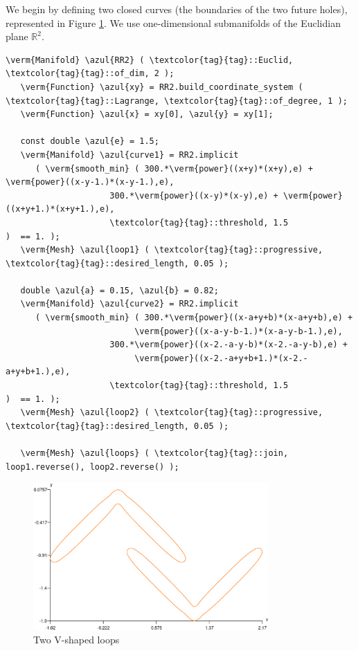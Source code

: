 We begin by defining two closed curves (the boundaries of the two future holes),
represented in Figure \ref{\numb section 7.\numb fig 12}.
We use one-dimensional submanifolds of the Euclidian plane $ \mathbb{R}^2 $.

\begin{Verbatim}[commandchars=\\\{\},formatcom=\small\tt,frame=single,
   rulecolor=\color{coment},baselinestretch=0.94,framesep=2mm         ]
   \verm{Manifold} \azul{RR2} ( \textcolor{tag}{tag}::Euclid, \textcolor{tag}{tag}::of_dim, 2 );
   \verm{Function} \azul{xy} = RR2.build_coordinate_system ( \textcolor{tag}{tag}::Lagrange, \textcolor{tag}{tag}::of_degree, 1 );
   \verm{Function} \azul{x} = xy[0], \azul{y} = xy[1];
   
   const double \azul{e} = 1.5;
   \verm{Manifold} \azul{curve1} = RR2.implicit 
      ( \verm{smooth_min} ( 300.*\verm{power}((x+y)*(x+y),e) + \verm{power}((x-y-1.)*(x-y-1.),e),
                     300.*\verm{power}((x-y)*(x-y),e) + \verm{power}((x+y+1.)*(x+y+1.),e),
                     \textcolor{tag}{tag}::threshold, 1.5                     )  == 1. );
   \verm{Mesh} \azul{loop1} ( \textcolor{tag}{tag}::progressive, \textcolor{tag}{tag}::desired_length, 0.05 );
      
   double \azul{a} = 0.15, \azul{b} = 0.82;
   \verm{Manifold} \azul{curve2} = RR2.implicit 
      ( \verm{smooth_min} ( 300.*\verm{power}((x-a+y+b)*(x-a+y+b),e) +
                          \verm{power}((x-a-y-b-1.)*(x-a-y-b-1.),e),
                     300.*\verm{power}((x-2.-a-y-b)*(x-2.-a-y-b),e) +
                          \verm{power}((x-2.-a+y+b+1.)*(x-2.-a+y+b+1.),e),
                     \textcolor{tag}{tag}::threshold, 1.5                           )  == 1. );
   \verm{Mesh} \azul{loop2} ( \textcolor{tag}{tag}::progressive, \textcolor{tag}{tag}::desired_length, 0.05 );

   \verm{Mesh} \azul{loops} ( \textcolor{tag}{tag}::join, loop1.reverse(), loop2.reverse() );                     
\end{Verbatim}

\begin{figure}[ht] \centering
  \includegraphics[width=90mm]{boomerang-1.eps}
  \caption{Two V-shaped loops}
  \label{\numb section 7.\numb fig 12}
\end{figure}

